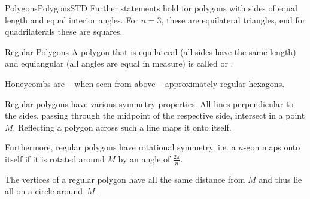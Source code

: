 \begin{MXContent}{Polygons}{Polygons}{STD}
Further statements hold for polygons with sides of equal length and equal 
interior angles. For $n=3$, these are equilateral triangles, end for 
quadrilaterals these are squares.

\begin{MXInfo}{Regular Polygons}
A polygon that is  equilateral (all sides have the same length) and
equiangular (all angles are equal in measure) is called 
 or 
.
\end{MXInfo}

Honeycombs are -- when seen from above -- approximately regular hexagons.
\begin{center}
\end{center}

Regular polygons have various symmetry properties. All lines perpendicular to the sides,
passing through the midpoint of the respective side, intersect in a point $M$. Reflecting 
a polygon across such a line maps it onto itself.

Furthermore, regular polygons have rotational symmetry, i.e. a $n$-gon maps onto itself
if it is rotated around $M$ by an angle of $\frac{2 \pi}{n}$.

The vertices of a regular polygon have all the same distance from $M$ and thus lie 
all on a circle around~$M$.
\end{MXContent}


